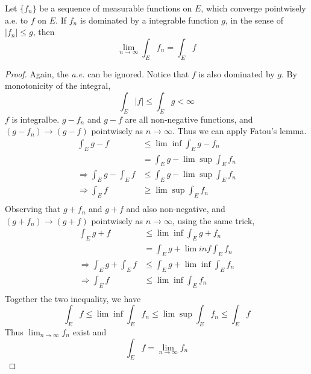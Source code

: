 \documentclass[lang=en, 12pt]{elegantbook}
\begin{document}
    \begin{theorem}
        Let $\{f_n\}$ be a sequence of measurable functions on $E$, which converge pointwisely a.e. to $f$ on $E$. If $f_n$ is dominated 
    by a integrable function $g$, in the sense of $|f_n|\leq g$, then
        $$\lim_{n \to \infty} \int_E f_n = \int_E f$$
    \end{theorem}
    \begin{proof}
        Again, the \textsl{a.e.} can be ignored. Notice that $f$ is also dominated by $g$. By monotonicity of the integral,
        $$\int_E |f| \leq \int_E g < \infty$$
    $f$ is integralbe.
        $g-f_n$ and $g-f$ are all non-negative functions, and $(g-f_n) \to (g-f)$ pointwisely as $n \to \infty$. Thus we can apply 
    Fatou's lemma.
        \begin{equation*}
            \begin{aligned}
                \int_E g-f &\leq \lim \inf \int_E g -f_n \\            
                &= \int_E g - \lim \sup \int_E f_n\\
                \Rightarrow \int_E g- \int_E f &\leq \int_E g - \lim \sup \int_E f_n\\
                \Rightarrow \int_E f &\geq \lim \sup \int_E f_n\\
            \end{aligned}
        \end{equation*}
    Observing that $g+ f_n$ and $g+f$ and also non-negative, and $(g+f_n) \to (g+f)$ pointwisely as $n \to \infty$,
    using the same trick,
        \begin{equation*}
            \begin{aligned}
                \int_E g+f &\leq \lim \inf \int_E g +f_n \\            
                &= \int_E g + \lim inf \int_E f_n\\
                \Rightarrow \int_E g+ \int_E f &\leq \int_E g + \lim \inf \int_E f_n\\
                \Rightarrow \int_E f &\leq \lim \inf \int_E f_n\\
            \end{aligned}
        \end{equation*}
    Together the two inequality, we have 
        $$\int_E f \leq \lim \inf \int_E f_n \leq \lim \sup \int_E f_n \leq \int_E f$$
    Thus $\lim_{n\to \infty} f_n$ exist and 
    $$\int_E f = \lim_{n\to \infty} f_n$$ 
    \end{proof}
    \begin{theorem}

    \end{theorem}
    \begin{definition}
        
    \end{definition}
\end{document}
